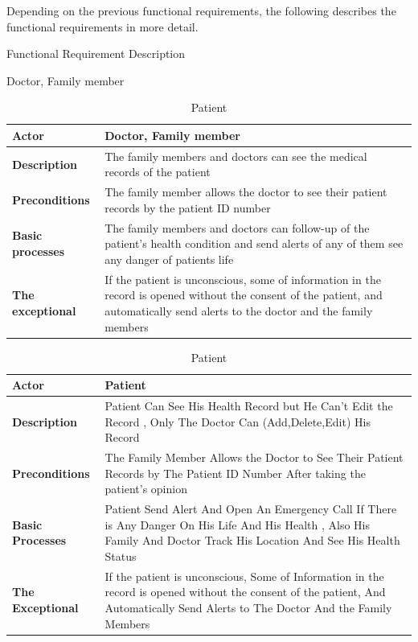 \documentclass[12pt]{article}
\begin{document}
			\quad Depending on the previous functional requirements, the following describes the functional requirements in more detail.
			\begin{table}[!h]
				\centering
				\caption{Functional Requirement Description}
				\begin{subtable}{\textwidth}
					\centering
					\caption{Doctor, Family member}
					\begin{tabular}{|l|p{10cm}|}
						\hline
						\rowcolor{lightgray}
						\textbf{Actor} & \textbf{Doctor, Family member} \\
						\hline
						\textbf{Description} & The family members and doctors can see the medical records of the patient \\
						\hline
						\textbf{Preconditions} & The family member allows the doctor to see their patient records by the patient ID number \\
						\hline
						\textbf{Basic processes} & The family members and doctors can follow-up of the patient's health condition and send alerts of any of them see any danger of patients life \\
						\hline
						\textbf{The exceptional} & If the patient is unconscious, some of information in the record is opened without the consent of the patient, and automatically send alerts to the doctor and the family members \\
						\hline
					\end{tabular}
				\end{subtable}
				\begin{center}
				\end{center}
				\begin{subtable}{\textwidth}
					\centering
					\caption{Patient}
					\begin{tabular}{|l|p{10cm}|}
						\hline
						\rowcolor{lightgray}
						\textbf{Actor} & \textbf{Patient} \\
						\hline
						\textbf{Description} & Patient Can See His Health Record but He Can't Edit the Record , Only The Doctor Can (Add,Delete,Edit) His Record \\
						\hline
						\textbf{Preconditions} & The Family Member Allows the Doctor to See Their Patient Records by The Patient ID Number After taking the patient's opinion \\
						\hline
						\textbf{Basic Processes} & Patient Send Alert And Open An Emergency Call If There is Any Danger On His Life And His Health , Also His Family And Doctor Track His Location And See His Health Status \\
						\hline
						\textbf{The Exceptional} & If the patient is unconscious, Some of Information in the record is opened without the consent of the patient, And Automatically Send Alerts to The Doctor And the Family Members \\
						\hline
					\end{tabular}
				\end{subtable}
			\end{table}
		\newpage
		
\end{document}
